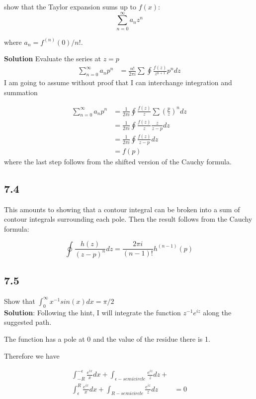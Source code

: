 \documentclass[]{article}
\begin{document}
show that the Taylor expansion sums up to $f(x)$:
\begin{equation}
\sum_{n=0}^\infty a_n z^n
\end{equation}

where $a_n = f^{(n)}(0)/n!$.

\textbf{Solution}
Evaluate the series at $z = p$
\begin{eqnarray}
\sum_{n=0}^\infty a_n p^n &= \frac{n!}{2\pi i} \sum \oint \frac{f(z)}{z^{n+1}} p^n dz
\end{eqnarray}
I am going to assume without proof that I can interchange integration and summation

\begin{eqnarray}
\sum_{n=0}^\infty a_n p^n &= 
\frac{1}{2\pi i} \oint \frac{f(z)}{z} \sum (\frac{p}{z})^n dz \\
  &= \frac{1}{2\pi i} \oint \frac{f(z)}{z} \frac{z}{z-p} dz \\
  &= \frac{1}{2\pi i} \oint \frac{f(z)}{z-p}dz\\
  &= f(p)
\end{eqnarray}
where the last step follows from the shifted version of the Cauchy formula.

\subsection*{7.4}
This amounts to showing that a contour integral can be broken into a sum of contour integrals surrounding each pole. Then the result follows from the Cauchy formula:

$$
\oint \frac{h(z)}{(z-p)^n} dz = \frac{2\pi i}{(n-1)!} h^{(n-1)}(p)
$$

\subsection*{7.5}
Show that $\int_0^{\infty} x^{-1}sin(x)dx = \pi/2$ \\

\textbf{Solution}:
Following the hint, I will integrate the function  $z^{-1}e^{iz}$ along the suggested path.

The function has a pole at 0 and the value of the residue there is 1.

Therefore we have 

\begin{eqnarray}
\int_{-R}^{-\epsilon}\frac{e^{ix}}{x}dx +\int_{\epsilon-semicircle } \frac{e^{iz}}{z}dz +\\
\int_{\epsilon}^R\frac{e^{ix}}{x}dx +\int_{R-semicircle } \frac{e^{iz}}{z}dz &= 0
\end{eqnarray}
\end{document}
